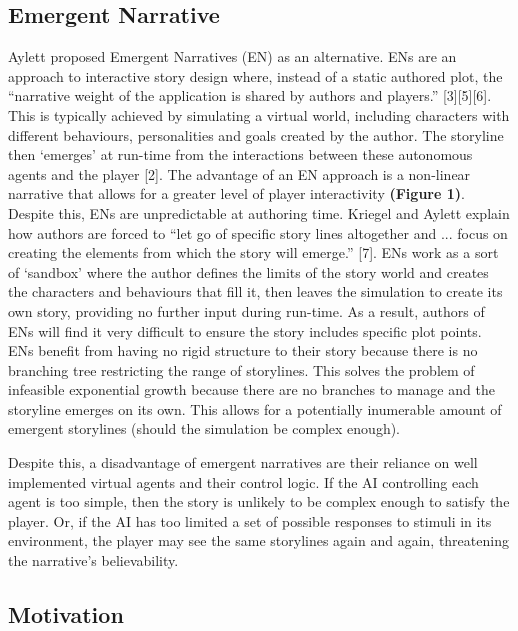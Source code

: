 \documentclass{sig-alternate-05-2015}
\begin{document}
\subsection{Emergent Narrative}

Aylett proposed Emergent Narratives (EN) as an alternative. ENs are an approach to interactive story design where, instead of a static authored plot, the ``narrative weight of the application is shared by authors and players.'' [3][5][6]. This is typically achieved by simulating a virtual world, including characters with different behaviours, personalities and goals created by the author. The storyline then `emerges' at run-time from the interactions between these autonomous agents and the player [2]. The advantage of an EN approach is a non-linear narrative that allows for a greater level of player interactivity \textbf{(Figure 1)}. Despite this, ENs are unpredictable at authoring time. Kriegel and Aylett explain how authors are forced to ``let go of specific story lines altogether and ... focus on creating the elements from which the story will emerge.'' [7]. ENs work as a sort of `sandbox' where the author defines the limits of the story world and creates the characters and behaviours that fill it, then leaves the simulation to create its own story, providing no further input during run-time. As a result, authors of ENs will find it very difficult to ensure the story includes specific plot points. \\

ENs benefit from having no rigid structure to their story because there is no branching tree restricting the range of storylines. This solves the problem of infeasible exponential growth because there are no branches to manage and the storyline emerges on its own. This allows for a potentially inumerable amount of emergent storylines (should the simulation be complex enough).

Despite this, a disadvantage of emergent narratives are their reliance on well implemented virtual agents and their control logic. If the AI controlling each agent is too simple, then the story is unlikely to be complex enough to satisfy the player. Or, if the AI has too limited a set of possible responses to stimuli in its environment, the player may see the same storylines again and again, threatening the narrative's believability.

\subsection{Motivation}
\end{document}
